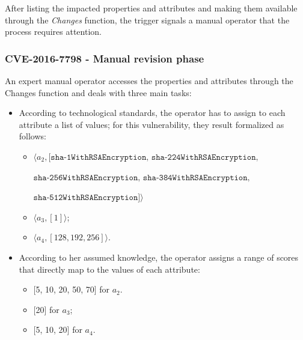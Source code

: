After listing the impacted properties and attributes and making them available through the \textit{Changes} function, the trigger signals a manual operator that the process requires attention.

\subsubsection{CVE-2016-7798 - Manual revision phase}
An expert manual operator accesses the properties and attributes through the Changes function and deals with three main tasks:
\begin{itemize}
    \item According to technological standards, the operator has to assign to each attribute a list of values; for this vulnerability, they result formalized as follows:
    \begin{itemize}
        \item \(\langle a_2, [\texttt{sha-1WithRSAEncryption, sha-224WithRSAEncryption,}\)
        
        \(\texttt{sha-256WithRSAEncryption, sha-384WithRSAEncryption,} \)
        
        \(\texttt{sha-512WithRSAEncryption}]\rangle\)
        \item \(\langle a_3, [1] \rangle\);
        \item \(\langle a_4, [128, 192, 256] \rangle\).
    \end{itemize}
    
    \item According to her assumed knowledge, the operator assigns a range of scores that directly map to the values of each attribute:
    \begin{itemize}
        \item {[5, 10, 20, 50, 70]} for \(a_2\).
        \item {[20]} for \(a_3\);
        \item {[5, 10, 20]} for \(a_4\).
    \end{itemize}
    
\end{itemize}


